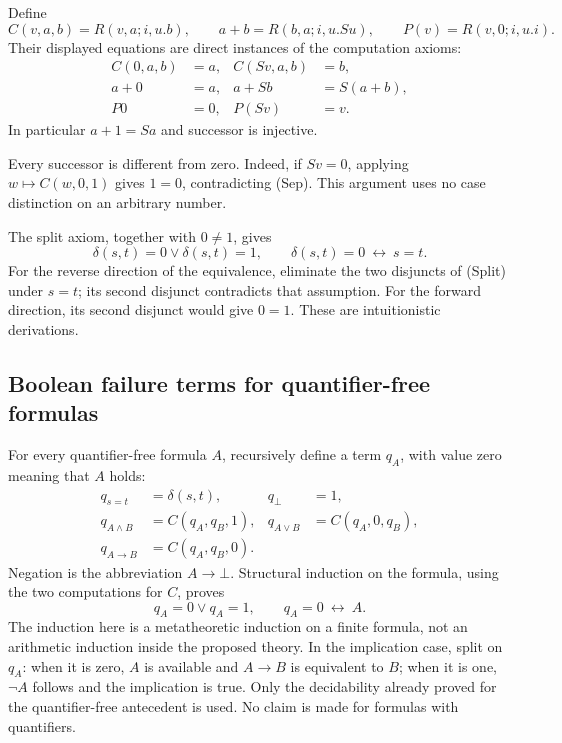 \documentclass[11pt]{article}
\theoremstyle{definition}\newtheorem{definition}[theorem]{Definition}
\begin{document}
Define
\[
 C(v,a,b)=R(v,a;i,u.b),\qquad
 a+b=R(b,a;i,u.Su),\qquad
 P(v)=R(v,0;i,u.i).
\]
Their displayed equations are direct instances of the computation axioms:
\begin{align*}
 C(0,a,b)&=a,& C(Sv,a,b)&=b,\\
 a+0&=a,& a+Sb&=S(a+b),\\
 P0&=0,& P(Sv)&=v.
\end{align*}
In particular $a+1=Sa$ and successor is injective.

Every successor is different from zero.  Indeed, if $Sv=0$, applying
$w\mapsto C(w,0,1)$ gives $1=0$, contradicting \textup{(Sep)}.
This argument uses no case distinction on an arbitrary number.

The split axiom, together with $0\ne1$, gives
\[
 \delta(s,t)=0\lor\delta(s,t)=1,
 \qquad \delta(s,t)=0\ \longleftrightarrow\ s=t.
 \tag{E}\label{eq:const-eqreflection}
\]
For the reverse direction of the equivalence, eliminate the two
disjuncts of \textup{(Split)} under $s=t$; its second disjunct contradicts
that assumption.  For the forward direction, its second disjunct would
give $0=1$.  These are intuitionistic derivations.

\subsection{Boolean failure terms for quantifier-free formulas}

For every quantifier-free formula $A$, recursively define a term $q_A$,
with value zero meaning that $A$ holds:
\begin{align*}
 q_{s=t}&=\delta(s,t), &q_\bot&=1,\\
 q_{A\land B}&=C(q_A,q_B,1),
 &q_{A\lor B}&=C(q_A,0,q_B),\\
 q_{A\to B}&=C(q_A,q_B,0).
\end{align*}
Negation is the abbreviation $A\to\bot$.  Structural induction on the
formula, using the two computations for $C$, proves
\[
 q_A=0\lor q_A=1,
 \qquad q_A=0\ \longleftrightarrow\ A.
 \tag{B}\label{eq:const-boolean}
\]
The induction here is a metatheoretic induction on a finite formula, not
an arithmetic induction inside the proposed theory.  In the implication
case, split on $q_A$: when it is zero, $A$ is available and $A\to B$ is
equivalent to $B$; when it is one, $\neg A$ follows and the implication
is true.  Only the decidability already proved for the quantifier-free
antecedent is used.  No claim is made for formulas with quantifiers.
\end{document}
